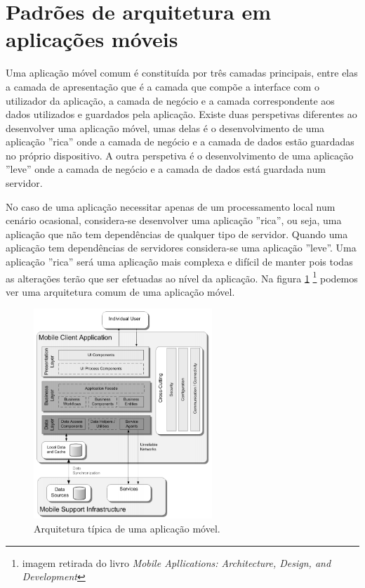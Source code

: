 \newpage
\section{Padrões de arquitetura em aplicações móveis}
Uma aplicação móvel comum é constituída por três camadas principais, entre elas a camada de apresentação que é a camada que compõe a interface com o utilizador da aplicação, a camada de negócio e a camada correspondente aos dados utilizados e guardados pela aplicação. Existe duas perspetivas diferentes ao desenvolver uma aplicação móvel, umas delas é o desenvolvimento de uma aplicação ''rica'' onde a camada de negócio e a camada de dados estão guardadas no próprio dispositivo. A outra perspetiva é o desenvolvimento de uma aplicação ''leve'' onde a camada de negócio e a camada de dados está guardada num servidor. 
\par
No caso de uma aplicação necessitar apenas de um processamento local num cenário ocasional, considera-se desenvolver uma aplicação ''rica'', ou seja, uma aplicação que não tem dependências de qualquer tipo de servidor. Quando uma aplicação tem dependências de servidores considera-se uma aplicação ''leve''. Uma aplicação ''rica'' será uma aplicação mais complexa e difícil de manter pois todas as alterações terão que ser efetuadas ao nível da aplicação.
Na figura \ref{f:mobileapparch} \footnote{imagem retirada do livro \textit{Mobile Apllications: Architecture, Design, and Development}} podemos ver uma arquitetura comum de uma aplicação móvel. \cite{mobileappbook}

\begin{figure}[H]
  \centering
  \includegraphics[width=0.6\textwidth]{imgs/mobileapparch.png}
  \caption[Arquitetura t\'ipica de uma  aplica\c c\~ao móvel]{Arquitetura t\'ipica de uma  aplica\c c\~ao móvel. \cite{mobileappbook}}
  
  \label{f:mobileapparch}
\end{figure}

